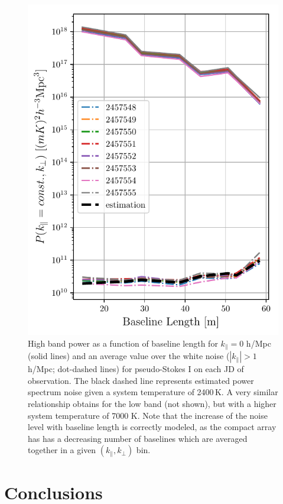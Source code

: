 \documentclass[twocolumn, trackchanges]{aastex61}
\begin{document}
\begin{figure}
\centering
\includegraphics[width=0.9\columnwidth]{noise_estimation.pdf}
\caption{High band power as a function of baseline length for $k_{\parallel}=0$
  h/Mpc (solid lines) and an average value over the white noise
  ($|k_{\parallel}|>1$ h/Mpc; dot-dashed lines) for pseudo-Stokes I on each JD
  of observation. The black dashed line represents estimated power spectrum
  noise given a system temperature of 2400\,K.  A very similar relationship
  obtains for the low band (not shown), but with a higher system temperature of
  7000 K.  Note that the increase of the noise level with baseline length is
  correctly modeled, as the compact array has has a decreasing number of
  baselines which are averaged together in a given $(k_{\parallel},k_{\perp})$
  bin.}
\label{fig:highband_cuts_per_day}
\end{figure}

\section{Conclusions}
\label{conc}
\end{document}
